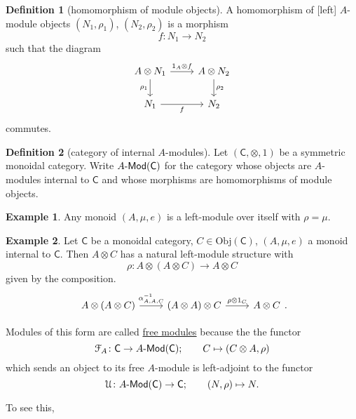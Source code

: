 \documentclass[a4paper]{report}
\newcommand{\defn}[1]{\ul{#1}}
\newcommand{\Obj}{\mathrm{Obj}}
\def\mhyp{{\hbox{-}}}
\theoremstyle{definition}
\newtheorem{definition}{Definition}[section]
\newtheorem{example}{Example}[section]
\theoremstyle{plain}
\theoremstyle{remark}
\begin{document}
\begin{definition}[homomorphism of module objects]
  \label{def:homomorphismofmoduleobjects}
  A homomorphism of [left] $A$-module objects $(N_{1}, \rho_{1})$, $(N_{2}, \rho_{2})$ is a morphism
  \begin{equation*}
    f\colon N_{1} \to N_{2}
  \end{equation*}
  such that the diagram
  \begin{equation*}
    \begin{tikzcd}
      A \otimes N_{1}
      \arrow[r, "1_{A} \otimes f"]
      \arrow[d, swap, "\rho_{1}"]
      & A \otimes N_{2}
      \arrow[d, "\rho_{2}"]
      \\
      N_{1}
      \arrow[r, swap, "f"]
      & N_{2}
    \end{tikzcd}
  \end{equation*}
  commutes.
\end{definition}

\begin{definition}[category of internal $A$-modules]
  \label{def:categoryofinternalmodules}
  Let $(\mathsf{C}, \otimes, 1)$ be a symmetric monoidal category. Write $A\mhyp\mathsf{Mod}(\mathsf{C})$ for the category whose objects are $A$-modules internal to $\mathsf{C}$ and whose morphisms are homomorphisms of module objects.
\end{definition}

\begin{example}
  \label{eg:anyringisamoduleoveritself}
  Any monoid $(A, \mu, e)$ is a left-module over itself with $\rho = \mu$.
\end{example}

\begin{example}
  \label{eg:freemodule}
  Let $\mathsf{C}$ be a monoidal category, $C \in \Obj(\mathsf{C})$, $(A, \mu, e)$ a monoid internal to $\mathsf{C}$. Then $A \otimes C$ has a natural left-module structure with
  \begin{equation*}
    \rho\colon A \otimes (A \otimes C) \to A \otimes C
  \end{equation*}
  given by the composition.
  \begin{equation*}
    \begin{tikzcd}
      A \otimes (A \otimes C)
      \arrow[r, "{\alpha_{A, A ,C}^{-1}}"]
      & (A \otimes A) \otimes C
      \arrow[r, "\rho \otimes 1_{C}"]
      & A \otimes C
    \end{tikzcd}.
  \end{equation*}

  Modules of this form are called \defn{free modules} because the the functor 
  \begin{equation*}
    \mathcal{F}_{A}\colon \mathsf{C} \to A\mhyp\mathsf{Mod}(\mathsf{C});\qquad C \mapsto (C \otimes A, \rho)
  \end{equation*}
  which sends an object to its free $A$-module is left-adjoint to the functor 
  \begin{equation*}
    \mathcal{U}\colon A\mhyp\mathsf{Mod}(\mathsf{C}) \to \mathsf{C};\qquad (N, \rho) \mapsto N.
  \end{equation*}

  To see this,
\end{example}
\end{document}
